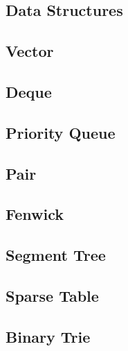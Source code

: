 \documentclass[10pt]{extarticle}
\begin{document}
\begin{multicols*}{3}

\tableofcontents



%

\section{Data Structures}
\subsection{Vector}


\subsection{Deque}


\subsection{Priority Queue}


\subsection{Pair}


\subsection{Fenwick}


\subsection{Segment Tree}


\subsection{Sparse Table}


\subsection{Binary Trie}



\end{multicols*}
\end{document}
